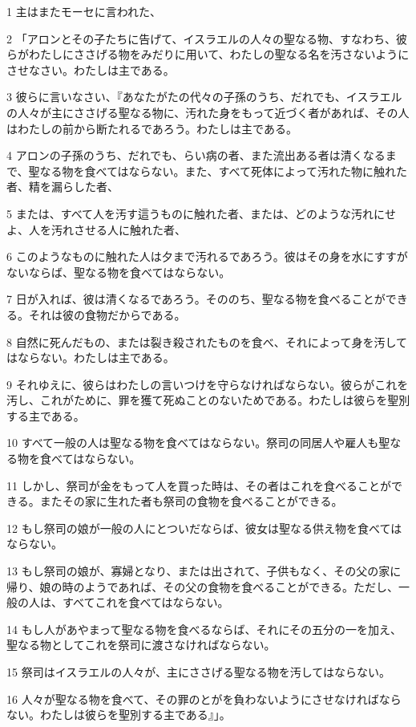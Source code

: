 \par 1 主はまたモーセに言われた、
\par 2 「アロンとその子たちに告げて、イスラエルの人々の聖なる物、すなわち、彼らがわたしにささげる物をみだりに用いて、わたしの聖なる名を汚さないようにさせなさい。わたしは主である。
\par 3 彼らに言いなさい、『あなたがたの代々の子孫のうち、だれでも、イスラエルの人々が主にささげる聖なる物に、汚れた身をもって近づく者があれば、その人はわたしの前から断たれるであろう。わたしは主である。
\par 4 アロンの子孫のうち、だれでも、らい病の者、また流出ある者は清くなるまで、聖なる物を食べてはならない。また、すべて死体によって汚れた物に触れた者、精を漏らした者、
\par 5 または、すべて人を汚す這うものに触れた者、または、どのような汚れにせよ、人を汚れさせる人に触れた者、
\par 6 このようなものに触れた人は夕まで汚れるであろう。彼はその身を水にすすがないならば、聖なる物を食べてはならない。
\par 7 日が入れば、彼は清くなるであろう。そののち、聖なる物を食べることができる。それは彼の食物だからである。
\par 8 自然に死んだもの、または裂き殺されたものを食べ、それによって身を汚してはならない。わたしは主である。
\par 9 それゆえに、彼らはわたしの言いつけを守らなければならない。彼らがこれを汚し、これがために、罪を獲て死ぬことのないためである。わたしは彼らを聖別する主である。
\par 10 すべて一般の人は聖なる物を食べてはならない。祭司の同居人や雇人も聖なる物を食べてはならない。
\par 11 しかし、祭司が金をもって人を買った時は、その者はこれを食べることができる。またその家に生れた者も祭司の食物を食べることができる。
\par 12 もし祭司の娘が一般の人にとついだならば、彼女は聖なる供え物を食べてはならない。
\par 13 もし祭司の娘が、寡婦となり、または出されて、子供もなく、その父の家に帰り、娘の時のようであれば、その父の食物を食べることができる。ただし、一般の人は、すべてこれを食べてはならない。
\par 14 もし人があやまって聖なる物を食べるならば、それにその五分の一を加え、聖なる物としてこれを祭司に渡さなければならない。
\par 15 祭司はイスラエルの人々が、主にささげる聖なる物を汚してはならない。
\par 16 人々が聖なる物を食べて、その罪のとがを負わないようにさせなければならない。わたしは彼らを聖別する主である』」。
